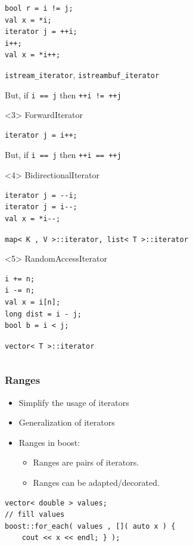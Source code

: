 \documentclass{beamer}
\newcommand{\heading}[1]{\frametitle{#1}}
\begin{document}
{\begin{frame}[fragile]
\begin{columns}[T]
\begin{column}{0.55\textwidth}
\begin{onlyenv}
         \begin{lstlisting}
bool r = i != j;
val x = *i;
iterator j = ++i;
i++;
val x = *i++;
         \end{lstlisting}
{\tt istream\_iterator}, {\tt istreambuf\_iterator}

          \vspace{2ex}
          But, if {\tt i == j} then {\tt ++i != ++j}
      \end{onlyenv}
      \begin{onlyenv}<3>
         ForwardIterator
         \begin{lstlisting}
iterator j = i++;
         \end{lstlisting}

          \vspace{2ex}
          But, if {\tt i == j} then {\tt ++i == ++j}
      \end{onlyenv}
      \begin{onlyenv}<4>
         BidirectionalIterator
         \begin{lstlisting}
iterator j = --i;
iterator j = i--;
val x = *i--;
         \end{lstlisting}
         {\tt map< K , V >::iterator, list< T >::iterator}
      \end{onlyenv}
      \begin{onlyenv}<5>
         RandomAccessIterator
         \begin{lstlisting}
i += n;
i -= n;
val x = i[n];
long dist = i - j;
bool b = i < j;
         \end{lstlisting}
         {\tt vector< T >::iterator}
      \end{onlyenv}
    \end{column}
  \end{columns}
\end{frame}
}


\begin{frame}[fragile]
  \heading{Ranges}
  
  \begin{itemize}
   \item Simplify the usage of iterators
   \item Generalization of iterators
   \item Ranges in boost:
   \begin{itemize}
    \item Ranges are pairs of iterators.
    \item Ranges can be adapted/decorated.
   \end{itemize}
  \end{itemize}


  \begin{lstlisting}[basicstyle=\scriptsize\ttfamily]
vector< double > values;
// fill values
boost::for_each( values , []( auto x ) {
    cout << x << endl; } );
  \end{lstlisting}


\end{frame}
\end{document}
